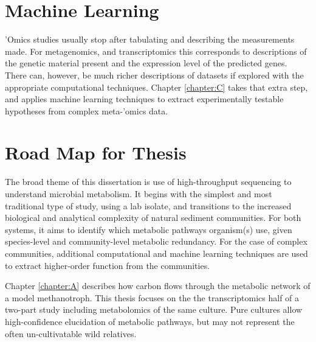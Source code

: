 \section{Machine Learning}
'Omics studies usually stop after tabulating and describing the measurements made.
For metagenomics, and transcriptomics this corresponds to descriptions of the genetic material present and the expression level of the predicted genes.
There can, however, be much richer descriptions of datasets if explored with the appropriate computational techniques.
Chapter \ref{chapter:C} takes that extra step, and applies machine learning techniques to extract experimentally testable hypotheses from complex meta-'omics data.


\section{Road Map for Thesis} %
The broad theme of this dissertation is use of high-throughput sequencing to understand microbial metabolism.
It begins with the simplest and most traditional type of study, using a lab isolate, and transitions to the increased biological and analytical complexity of natural sediment communities.
For both systems, it aims to identify which metabolic pathways organism(s) use, given species-level and community-level metabolic redundancy.
For the case of complex communities, additional computational and machine learning techniques are used to extract higher-order function from the communities.

Chapter \ref{chapter:A} describes how carbon flows through the metabolic network of a model methanotroph.
This thesis focuses on the the transcriptomics half \cite{matsenOB3b} of a two-part study including metabolomics \cite{yangOB3b} of the same culture.
Pure cultures allow high-confidence elucidation of metabolic pathways, but may not represent the often un-cultivatable wild relatives.

